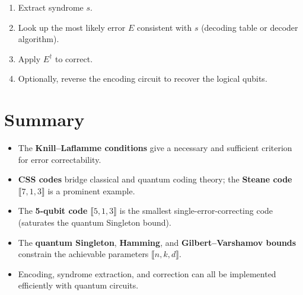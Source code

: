 \documentclass[11pt]{article}
\theoremstyle{definition}
\begin{document}
\begin{enumerate}
    \item Extract syndrome $s$.
    \item Look up the most likely error $E$ consistent with $s$ (decoding table or decoder algorithm).
    \item Apply $E^\dagger$ to correct.
    \item Optionally, reverse the encoding circuit to recover the logical qubits.
\end{enumerate}

\section{Summary}

\begin{itemize}
    \item The \textbf{Knill--Laflamme conditions} give a necessary and sufficient criterion for error correctability.
    \item \textbf{CSS codes} bridge classical and quantum coding theory; the \textbf{Steane code} $\llbracket 7,1,3\rrbracket$ is a prominent example.
    \item The \textbf{5-qubit code} $\llbracket 5,1,3\rrbracket$ is the smallest single-error-correcting code (saturates the quantum Singleton bound).
    \item The \textbf{quantum Singleton}, \textbf{Hamming}, and \textbf{Gilbert--Varshamov bounds} constrain the achievable parameters $\llbracket n,k,d\rrbracket$.
    \item Encoding, syndrome extraction, and correction can all be implemented efficiently with quantum circuits.
\end{itemize}
\end{document}
